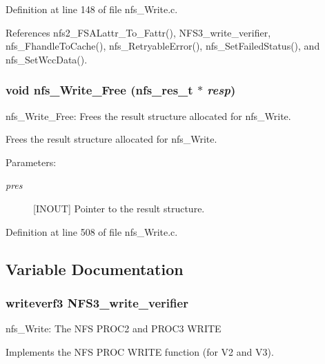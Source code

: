 Definition at line 148 of file nfs\_\-Write.c.

References nfs2\_\-FSALattr\_\-To\_\-Fattr(), NFS3\_\-write\_\-verifier, nfs\_\-Fhandle\-To\-Cache(), nfs\_\-Retryable\-Error(), nfs\_\-Set\-Failed\-Status(), and nfs\_\-Set\-Wcc\-Data().
\subsubsection{\setlength{\rightskip}{0pt plus 5cm}void nfs\_\-Write\_\-Free (nfs\_\-res\_\-t $\ast$ {\em resp})}\label{nfs__Write_8c_a2}


nfs\_\-Write\_\-Free: Frees the result structure allocated for nfs\_\-Write.

Frees the result structure allocated for nfs\_\-Write.

\begin{Desc}
\item[Parameters:]
\begin{description}
\item[{\em pres}][INOUT] Pointer to the result structure. \end{description}
\end{Desc}


Definition at line 508 of file nfs\_\-Write.c.

\subsection{Variable Documentation}
\subsubsection{\setlength{\rightskip}{0pt plus 5cm}writeverf3 {\bf NFS3\_\-write\_\-verifier}}\label{nfs__Write_8c_a0}


nfs\_\-Write: The NFS PROC2 and PROC3 WRITE

Implements the NFS PROC WRITE function (for V2 and V3).


